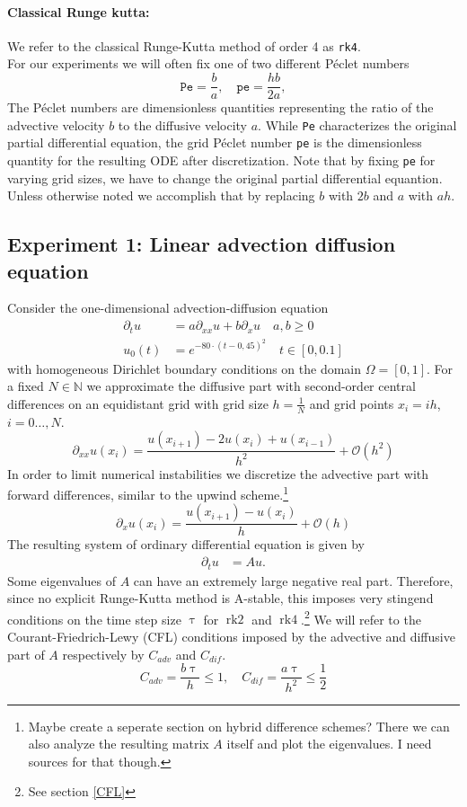\documentclass{scrartcl}
\begin{document}
\paragraph{Classical Runge kutta:}
	We refer to the classical Runge-Kutta method of order 4 as \texttt{rk4}.\\


\noindent For our experiments we will often fix one of two different P\'eclet numbers
\[\texttt{Pe} = \frac{b}{a}, \quad \texttt{pe} = \frac{hb}{2a},\]
The P\'eclet numbers are dimensionless quantities representing the ratio of the advective velocity $b$ to the diffusive velocity $a$. While \texttt{Pe} characterizes the original partial differential equation, the grid P\'eclet number \texttt{pe} is the dimensionless quantity for the resulting ODE after discretization. Note that by fixing \texttt{pe} for varying grid sizes, we have to change the original partial differential equantion. Unless otherwise noted we accomplish that by replacing $b$ with $2b$ and $a$ with $ah$.
   

\subsection{Experiment 1: Linear advection diffusion equation}
Consider the one-dimensional advection-diffusion equation
\begin{align*}
\partial_tu &= a\partial_{xx}u + b\partial_xu \quad a,b\ge 0\\
u_0(t) &= e^{-80\cdot(t-0,45)^2} \quad t\in[0,0.1]
\end{align*}
with homogeneous Dirichlet boundary conditions on the domain $\Omega = [0,1]$. 
For a fixed $N\in\mathbb N$ we approximate the diffusive part with second-order central differences on an equidistant grid with grid size $h = \frac{1}{N}$ and grid points $x_i = ih$, $i=0\dots,N$.
\[\partial_{xx}u(x_i) = \frac{u(x_{i+1}) - 2u(x_i) + u(x_{i-1})}{{h}^2} + \mathcal{O}({h}^2)\]
In order to limit numerical instabilities we discretize the advective part with forward differences, similar to the upwind scheme.\footnote{Maybe create a seperate section on hybrid difference schemes? There we can also analyze the resulting matrix $A$ itself and plot the eigenvalues. I need sources for that though.}
\[\partial_{x}u(x_i) = \frac{u(x_{i+1}) - u(x_i)}{h} + \mathcal{O}(h)\]
The resulting system of ordinary differential equation is given by
\begin{align*}
\partial_tu &= Au.
\end{align*} 
Some eigenvalues of $A$ can have an extremely large negative real part. Therefore, since no explicit Runge-Kutta method is A-stable, this imposes very stingend conditions on the time step size $\uptau$ for $\operatorname{rk2}$ and $\operatorname{rk4}$.\footnote{See section \ref{CFL}} We will refer to the Courant-Friedrich-Lewy (CFL) conditions imposed by the advective and diffusive part of $A$ respectively by $C_{adv}$ and $C_{dif}$.  
\[ C_{adv} = \frac{b\uptau}{h} \le 1, \quad C_{dif} = \frac{a\uptau}{h^2} \le \frac{1}{2}\] 
\end{document}
